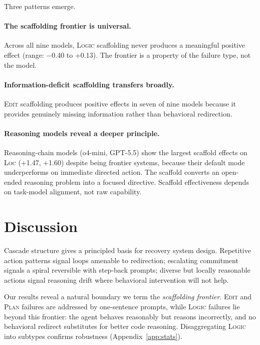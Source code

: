 \documentclass[11pt]{article}
\begin{document}
Three patterns emerge.

\paragraph{The scaffolding frontier is universal.}
Across all nine models, \textsc{Logic} scaffolding never produces a meaningful positive effect (range: $-$0.40 to +0.13).
The frontier is a property of the failure type, not the model.

\paragraph{Information-deficit scaffolding transfers broadly.}
\textsc{Edit} scaffolding produces positive effects in seven of nine models because it provides genuinely missing information rather than behavioral redirection.

\paragraph{Reasoning models reveal a deeper principle.}
Reasoning-chain models (o4-mini, GPT-5.5) show the largest scaffold effects on \textsc{Loc} (+1.47, +1.60) despite being frontier systems, because their default mode underperforms on immediate directed action.
The scaffold converts an open-ended reasoning problem into a focused directive.
Scaffold effectiveness depends on task-model alignment, not raw capability.


\FloatBarrier
\section{Discussion}
\label{sec:discussion}

Cascade structure gives a principled basis for recovery system design.
Repetitive action patterns signal loops amenable to redirection; escalating commitment signals a spiral reversible with step-back prompts; diverse but locally reasonable actions signal reasoning drift where behavioral intervention will not help.

Our results reveal a natural boundary we term the \textit{scaffolding frontier}.
\textsc{Edit} and \textsc{Plan} failures are addressed by one-sentence prompts, while \textsc{Logic} failures lie beyond this frontier: the agent behaves reasonably but reasons incorrectly, and no behavioral redirect substitutes for better code reasoning.
Disaggregating \textsc{Logic} into subtypes confirms robustness (Appendix~\ref{app:stats}).
\end{document}
